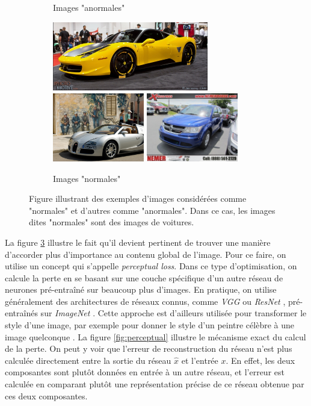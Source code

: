 \begin{figure} [htb]
\begin{subfigure}{.33\textwidth}
		\caption{Images "anormales"}
		\label{fig:sfig2}
	\end{subfigure}
	\begin{subfigure}{.33\textwidth}
		\centering
		\includegraphics[width=.8\linewidth,height=3cm]{images/images_anomalies/inlier-4}
		\includegraphics[width=.8\linewidth,height=3cm]{images/images_anomalies/inlier-5}
		\includegraphics[width=.8\linewidth,height=3cm]{images/images_anomalies/inlier-6}
		\caption{Images "normales"}
		\label{fig:sfig3}
	\end{subfigure}
	\centering
	\caption{Figure illustrant des exemples d'images considérées comme "normales" et d'autres comme "anormales". Dans ce cas, les images dites "normales" sont des images de voitures.}
	\label{fig:exemple_global}
\end{figure}

 La figure \ref{fig:exemple_global} illustre le fait qu'il devient pertinent de trouver une manière d'accorder plus d'importance au contenu global de l'image. Pour ce faire, on utilise un concept qui s'appelle \textit{perceptual loss}. Dans ce type d'optimisation, on calcule la perte en se basant sur une couche spécifique d'un autre réseau de neurones pré-entraîné sur beaucoup plus d'images. En pratique, on utilise généralement des architectures de réseaux connus,  comme \textit{VGG} \citep{DBLP:journals/corr/SimonyanZ14a}  ou \textit{ResNet} \citep{DBLP:journals/corr/HeZRS15}, pré-entraînés sur \textit{ImageNet} \citep{deng2009imagenet}. Cette approche est d'ailleurs utilisée pour transformer le style d'une image, par exemple pour donner le style d'un peintre célèbre à une image quelconque \citep{Johnson2016Perceptual}. La figure \ref{fig:perceptual} illustre le mécanisme exact du calcul de la perte. On peut y voir que l'erreur de reconstruction du réseau n'est plus calculée directement entre la sortie du réseau $\hat{x}$ et l'entrée $x$. En effet, les deux composantes sont plutôt données en entrée à un autre réseau, et l'erreur est calculée en comparant plutôt une représentation précise de ce réseau obtenue par ces deux composantes.

